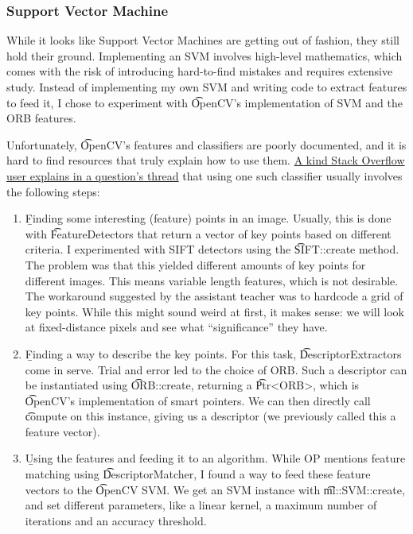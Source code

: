 \subsubsection{Support Vector Machine}

While it looks like Support Vector Machines are getting out of fashion, they still hold their ground. Implementing an SVM involves high-level mathematics, which comes with the risk of introducing hard-to-find mistakes and requires extensive study. Instead of implementing my own SVM and writing code to extract features to feed it, I chose to experiment with \t{OpenCV}'s implementation of SVM and the ORB features.

Unfortunately, \t{OpenCV}'s features and classifiers are poorly documented, and it is hard to find resources that truly explain how to use them. \href{https://stackoverflow.com/questions/29870726/brief-implementation-with-opencv-2-4-10}{A kind Stack Overflow user explains in a question's thread} that using one such classifier usually involves the following steps:

\begin{enumerate}
    \item \b{Finding some interesting (feature) points in an image.} Usually, this is done with \t{FeatureDetector}s that return a vector of key points based on different criteria. I experimented with SIFT detectors using the \t{SIFT::create} method. The problem was that this yielded different amounts of key points for different images. This means variable length features, which is not desirable. The workaround suggested by the assistant teacher was to hardcode a grid of key points. While this might sound weird at first, it makes sense: we will look at fixed-distance pixels and see what ``significance'' they have.
     
    \item \b{Finding a way to describe the key points.} For this task, \t{DescriptorExtractor}s come in serve. Trial and error led to the choice of ORB. Such a descriptor can be instantiated using \t{ORB::create}, returning a \t{Ptr<ORB>}, which is \t{OpenCV}'s implementation of smart pointers. We can then directly call \t{compute} on this instance, giving us a descriptor (we previously called this a feature vector).
    
    \item \b{Using the features and feeding it to an algorithm.} While OP mentions feature matching using \t{DescriptorMatcher}, I found a way to feed these feature vectors to the \t{OpenCV} SVM. We get an SVM instance with \t{ml::SVM::create}, and set different parameters, like a linear kernel, a maximum number of iterations and an accuracy threshold.
\end{enumerate}


